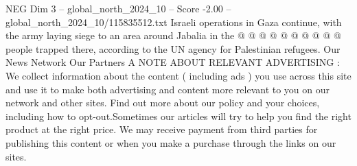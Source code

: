 \begin{textsample}{NEG Dim 3 – global\_north\_2024\_10 – Score -2.00 – global\_north\_2024\_10/115835512.txt}
Israeli operations in Gaza continue, with the army laying siege to an area around Jabalia in the @ @ @ @ @ @ @ @ @ @ people trapped there, according to the UN agency for Palestinian refugees.
Our News Network Our Partners A NOTE ABOUT RELEVANT ADVERTISING : We collect information about the content ( including ads ) you use across this site and use it to make both advertising and content more relevant to you on our network and other sites.
Find out more about our policy and your choices, including how to opt-out.Sometimes our articles will try to help you find the right product at the right price.
We may receive payment from third parties for publishing this content or when you make a purchase through the links on our sites.

\end{textsample}
